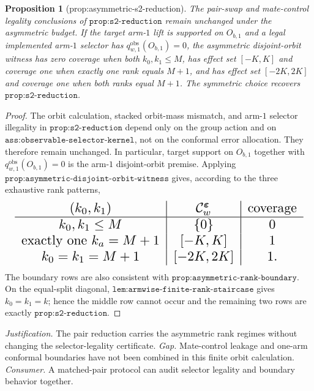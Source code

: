 \documentclass{article}
\newtheorem{proposition}{Proposition}
\begin{document}
\begin{proposition}[prop:asymmetric-s2-reduction]\label{prop:asymmetric-s2-reduction}
The pair-swap and mate-control legality conclusions of \(\texttt{prop:s2-reduction}\) remain unchanged under the asymmetric budget. If the target arm-\(1\) lift is supported on \(O_{b,1}\) and a legal implemented arm-\(1\) selector has \(q^{\mathrm{obs}}_{w,1}(O_{b,1})=0\), the asymmetric disjoint-orbit witness has zero coverage when both \(k_0,k_1\le M\), has effect set \([-K,K]\) and coverage one when exactly one rank equals \(M+1\), and has effect set \([-2K,2K]\) and coverage one when both ranks equal \(M+1\). The symmetric choice recovers \(\texttt{prop:s2-reduction}\).
\end{proposition}
\begin{proof}
The orbit calculation, stacked orbit-mass mismatch, and arm-\(1\) selector illegality in \(\texttt{prop:s2-reduction}\) depend only on the group action and on \(\texttt{ass:observable-selector-kernel}\), not on the conformal error allocation. They therefore remain unchanged. In particular, target support on \(O_{b,1}\) together with \(q^{\mathrm{obs}}_{w,1}(O_{b,1})=0\) is the arm-\(1\) disjoint-orbit premise. Applying \(\texttt{prop:asymmetric-disjoint-orbit-witness}\) gives, according to the three exhaustive rank patterns,
\[
\makebox[\linewidth][c]{\resizebox{0.98\linewidth}{!}{\(\displaystyle \begin{array}{c|c|c}
(k_0,k_1) & \mathcal C^{\boldsymbol\varepsilon}_w & \text{coverage}\\ \hline
k_0,k_1\le M & \{0\} & 0\\
\text{exactly one }k_a=M+1 & [-K,K] & 1\\
k_0=k_1=M+1 & [-2K,2K] & 1.
\end{array}\)}}
\]
The boundary rows are also consistent with \(\texttt{prop:asymmetric-rank-boundary}\). On the equal-split diagonal, \(\texttt{lem:armwise-finite-rank-staircase}\) gives \(k_0=k_1=k\); hence the middle row cannot occur and the remaining two rows are exactly \(\texttt{prop:s2-reduction}\).
\end{proof}
\par\smallskip\noindent \textit{Justification.} The pair reduction carries the asymmetric rank regimes without changing the selector-legality certificate. \textit{Gap.} Mate-control leakage and one-arm conformal boundaries have not been combined in this finite orbit calculation. \textit{Consumer.} A matched-pair protocol can audit selector legality and boundary behavior together.
\end{document}
